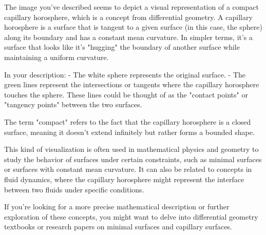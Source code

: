 The image you've described seems to depict a visual representation of a compact capillary horosphere, which is a concept from differential geometry. A capillary horosphere is a surface that is tangent to a given surface (in this case, the sphere) along its boundary and has a constant mean curvature. In simpler terms, it's a surface that looks like it's "hugging" the boundary of another surface while maintaining a uniform curvature.

In your description:
- The white sphere represents the original surface.
- The green lines represent the intersections or tangents where the capillary horosphere touches the sphere. These lines could be thought of as the "contact points" or "tangency points" between the two surfaces.

The term "compact" refers to the fact that the capillary horosphere is a closed surface, meaning it doesn't extend infinitely but rather forms a bounded shape.

This kind of visualization is often used in mathematical physics and geometry to study the behavior of surfaces under certain constraints, such as minimal surfaces or surfaces with constant mean curvature. It can also be related to concepts in fluid dynamics, where the capillary horosphere might represent the interface between two fluids under specific conditions.

If you're looking for a more precise mathematical description or further exploration of these concepts, you might want to delve into differential geometry textbooks or research papers on minimal surfaces and capillary surfaces.
